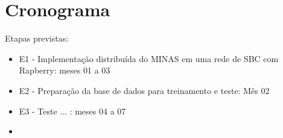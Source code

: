 \chapter{Cronograma}

Etapas previstas:

\begin{itemize}
    \item E1 - Implementação distribuída do MINAS em uma rede de SBC com Rapberry: meses 01 a 03
    \item E2 - Preparação da base de dados para treinamento e teste: Mês 02
    \item E3 - Teste ... : meses 04 a 07
    \item 
\end{itemize}

